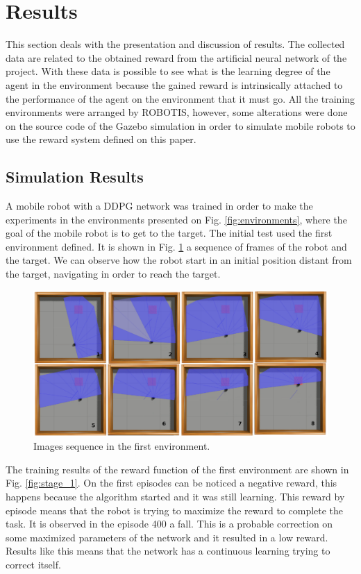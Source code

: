 \section*{Results}

This section deals with the presentation and discussion of results.
The collected data are related to the obtained reward from the artificial neural network of the project.
With these data is possible to see what is the learning degree of the agent in the environment because the gained reward is intrinsically attached to the performance of the agent on the environment that it must go.
All the training environments were arranged by ROBOTIS, however, some alterations were done on the source code of the Gazebo simulation in order to simulate mobile robots to use the reward system defined on this paper.

\subsection*{Simulation Results}

A mobile robot with a DDPG network was trained in order to make the experiments in the environments presented on Fig. \ref{fig:environments}, where the goal of the mobile robot is to get to the target.
The initial test used the first environment defined. It is shown in Fig. \ref{fig:amb1target} a sequence of frames of the robot and the target. We can observe how the robot start in an initial position distant from the target, navigating in order to reach the target.

\begin{figure}[H]
\centerline{\includegraphics[width=\columnwidth]{images/amb1target.png}}
\caption{Images sequence in the first environment.}
\label{fig:amb1target}
\end{figure}

The training results of the reward function of the first environment are shown in Fig. \ref{fig:stage_1}.
On the first episodes can be noticed a negative reward, this happens because the algorithm started and it was still learning. 
This reward by episode means that the robot is trying to maximize the reward to complete the task. 
It is observed in the episode 400 a fall. 
This is a probable correction on some maximized parameters of the network and it resulted in a low reward.
Results like this means that the network has a continuous learning trying to correct itself. 

